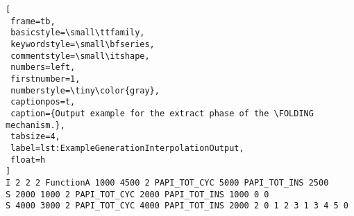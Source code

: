 \begin{lstlisting}[
 frame=tb,
 basicstyle=\small\ttfamily,
 keywordstyle=\small\bfseries,
 commentstyle=\small\itshape,
 numbers=left,
 firstnumber=1,
 numberstyle=\tiny\color{gray},
 captionpos=t,
 caption={Output example for the extract phase of the \FOLDING mechanism.},
 tabsize=4,
 label=lst:ExampleGenerationInterpolationOutput,
 float=h
]
I 2 2 2 FunctionA 1000 4500 2 PAPI_TOT_CYC 5000 PAPI_TOT_INS 2500
S 2000 1000 2 PAPI_TOT_CYC 2000 PAPI_TOT_INS 1000 0 0
S 4000 3000 2 PAPI_TOT_CYC 4000 PAPI_TOT_INS 2000 2 0 1 2 3 1 3 4 5 0
\end{lstlisting}
